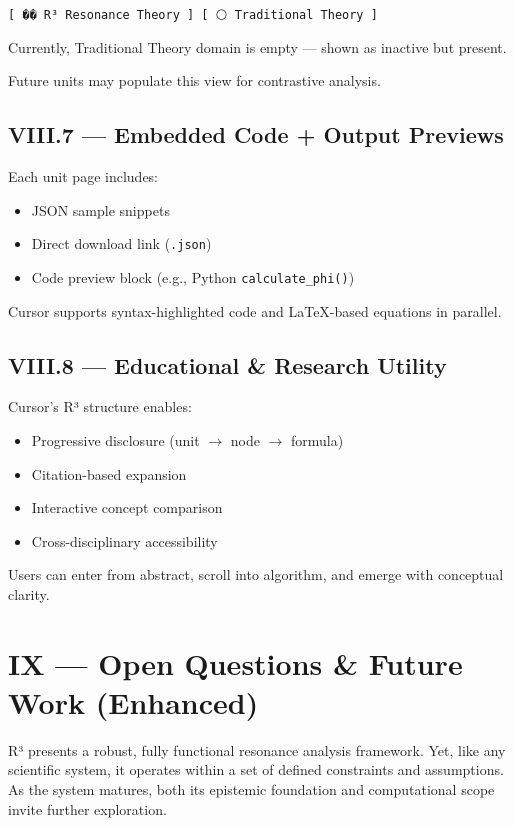 \documentclass{article}
\begin{document}
\begin{verbatim}
[ �� R³ Resonance Theory ] [ ⚪ Traditional Theory ]
\end{verbatim}

Currently, Traditional Theory domain is empty — shown as inactive but present.

Future units may populate this view for contrastive analysis.

\subsection*{VIII.7 — Embedded Code + Output Previews}

Each unit page includes:

\begin{itemize}
    \item JSON sample snippets
    \item Direct download link (\texttt{.json})
    \item Code preview block (e.g., Python \texttt{calculate\_phi()})
\end{itemize}

Cursor supports syntax-highlighted code and LaTeX-based equations in parallel.

\subsection*{VIII.8 — Educational \& Research Utility}

Cursor’s R³ structure enables:

\begin{itemize}
    \item Progressive disclosure (unit $\rightarrow$ node $\rightarrow$ formula)
    \item Citation-based expansion
    \item Interactive concept comparison
    \item Cross-disciplinary accessibility
\end{itemize}

Users can enter from abstract, scroll into algorithm, and emerge with conceptual clarity.

\section*{IX — Open Questions \& Future Work (Enhanced)}

R³ presents a robust, fully functional resonance analysis framework. Yet, like any scientific system, it operates within a set of defined constraints and assumptions. As the system matures, both its epistemic foundation and computational scope invite further exploration.
\end{document}
